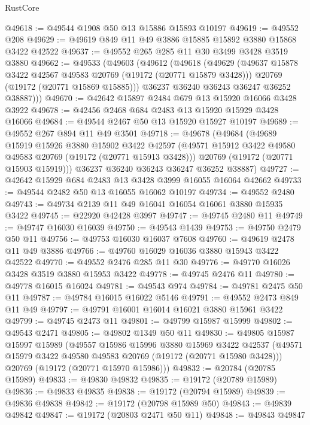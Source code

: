 \begin{lexlean}{RustCore}
\begin{coremodule}
@49618 := @49544 @1908 @50 @13 @15886 @15893 @10197
@49619 := @49552 @208
@49629 := @49619 @849 @11 @49 @3886 @15885 @15892 @3880 @15868 @3422 @42522
@49637 := @49552 @265 @285 @11 @30 @3499 @3428 @3519 @3880
@49662 := @49533
    (@49603
      (@49612
        (@49618
          (@49629
            (@49637 @15878 @3422 @42567 @49583 @20769 (@19172 (@20771 @15879 @3428)))
            @20769
            (@19172 (@20771 @15869 @15885)))
          @36237
          @36240
          @36243
          @36247
          @36252
          @38887)))
@49670 := @42642 @15897 @2484 @679 @13 @15920 @16066 @3428 @3922
@49678 := @42456 @2468 @684 @2483 @13 @15920 @15929 @3428 @16066
@49684 := @49544 @2467 @50 @13 @15920 @15927 @10197
@49689 := @49552 @267 @894 @11 @49 @3501
@49718 := @49678
    (@49684
      (@49689
        @15919
        @15926
        @3880
        @15902
        @3422
        @42597
        (@49571 @15912 @3422 @49580 @49583 @20769 (@19172 (@20771 @15913 @3428)))
        @20769
        (@19172 (@20771 @15903 @15919)))
      @36237
      @36240
      @36243
      @36247
      @36252
      @38887)
@49727 := @42642 @15929 @684 @2483 @13 @3428 @3999 @16055 @16064 @42662
@49733 := @49544 @2482 @50 @13 @16055 @16062 @10197
@49734 := @49552 @2480
@49743 := @49734 @2139 @11 @49 @16041 @16054 @16061 @3880 @15935 @3422
@49745 := @22920 @42428 @3997
@49747 := @49745 @2480 @11
@49749 := @49747 @16030 @16039
@49750 := @49543 @1439
@49753 := @49750 @2479 @50 @11
@49756 := @49753 @16030 @16037 @7608
@49760 := @49619 @2478 @11 @49 @3886
@49766 := @49760 @16029 @16036 @3880 @15943 @3422 @42522
@49770 := @49552 @2476 @285 @11 @30
@49776 := @49770 @16026 @3428 @3519 @3880 @15953 @3422
@49778 := @49745 @2476 @11
@49780 := @49778 @16015 @16024
@49781 := @49543 @974
@49784 := @49781 @2475 @50 @11
@49787 := @49784 @16015 @16022 @5146
@49791 := @49552 @2473 @849 @11 @49
@49797 := @49791 @16001 @16014 @16021 @3880 @15961 @3422
@49799 := @49745 @2473 @11
@49801 := @49799 @15987 @15999
@49802 := @49543 @2471
@49805 := @49802 @1349 @50 @11
@49830 := @49805
    @15987
    @15997
    @15989
    (@49557
      @15986
      @15996
      @3880
      @15969
      @3422
      @42537
      (@49571 @15979 @3422 @49580 @49583 @20769 (@19172 (@20771 @15980 @3428)))
      @20769
      (@19172 (@20771 @15970 @15986)))
@49832 := @20784 (@20785 @15989)
@49833 := @49830 @49832
@49835 := @19172 (@20789 @15989)
@49836 := @49833 @49835
@49838 := @19172 (@20794 @15989)
@49839 := @49836 @49838
@49842 := @19172 (@20798 @15989 @50)
@49843 := @49839 @49842
@49847 := @19172 (@20803 @2471 @50 @11)
@49848 := @49843 @49847

\end{coremodule}
\end{lexlean}
